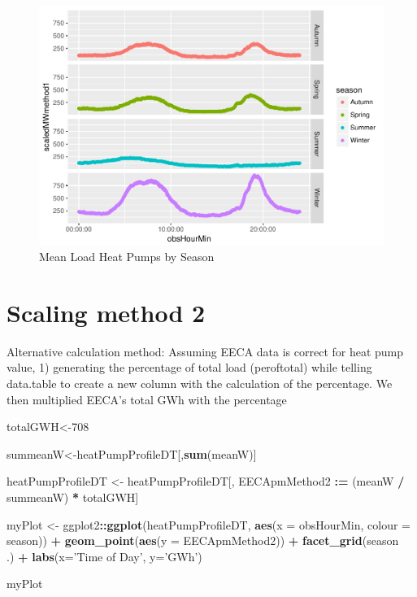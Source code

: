 \documentclass[]{article}
\newenvironment{Shaded}{\begin{snugshade}}{\end{snugshade}}
\newcommand{\KeywordTok}[1]{\textcolor[rgb]{0.13,0.29,0.53}{\textbf{#1}}}
\newcommand{\DataTypeTok}[1]{\textcolor[rgb]{0.13,0.29,0.53}{#1}}
\newcommand{\DecValTok}[1]{\textcolor[rgb]{0.00,0.00,0.81}{#1}}
\newcommand{\StringTok}[1]{\textcolor[rgb]{0.31,0.60,0.02}{#1}}
\newcommand{\OperatorTok}[1]{\textcolor[rgb]{0.81,0.36,0.00}{\textbf{#1}}}
\newcommand{\ErrorTok}[1]{\textcolor[rgb]{0.64,0.00,0.00}{\textbf{#1}}}
\newcommand{\NormalTok}[1]{#1}
\begin{document}
\begin{figure}
\centering
\includegraphics{heatPumpProfileAnalysis_files/figure-latex/scaledUpPlots-1.pdf}
\caption{\label{fig:scaledUpPlots}Mean Load Heat Pumps by Season}
\end{figure}

\section{Scaling method 2}\label{scaling-method-2}

Alternative calculation method: Assuming EECA data is correct for heat
pump value, 1) generating the percentage of total load (peroftotal)
while telling data.table to create a new column with the calculation of
the percentage. We then multiplied EECA's total GWh with the percentage

\begin{Shaded}
\begin{Highlighting}[]
\NormalTok{totalGWH<-}\DecValTok{708}

\NormalTok{summeanW<-heatPumpProfileDT[,}\KeywordTok{sum}\NormalTok{(meanW)]}



\NormalTok{heatPumpProfileDT <-}\StringTok{ }\NormalTok{heatPumpProfileDT[, EECApmMethod2 }\OperatorTok{:}\ErrorTok{=}\StringTok{ }\NormalTok{(meanW }\OperatorTok{/}\StringTok{ }\NormalTok{summeanW) }\OperatorTok{*}\StringTok{ }\NormalTok{totalGWH] }

\NormalTok{myPlot <-}\StringTok{ }\NormalTok{ggplot2}\OperatorTok{::}\KeywordTok{ggplot}\NormalTok{(heatPumpProfileDT, }\KeywordTok{aes}\NormalTok{(}\DataTypeTok{x =}\NormalTok{ obsHourMin, }\DataTypeTok{colour =}\NormalTok{ season)) }\OperatorTok{+}
\StringTok{  }\KeywordTok{geom_point}\NormalTok{(}\KeywordTok{aes}\NormalTok{(}\DataTypeTok{y =}\NormalTok{ EECApmMethod2)) }\OperatorTok{+}
\StringTok{  }\KeywordTok{facet_grid}\NormalTok{(season }\OperatorTok{~}\StringTok{ }\NormalTok{.) }\OperatorTok{+}
\StringTok{  }\KeywordTok{labs}\NormalTok{(}\DataTypeTok{x=}\StringTok{'Time of Day'}\NormalTok{, }\DataTypeTok{y=}\StringTok{'GWh'}\NormalTok{)}

\NormalTok{myPlot}
\end{Highlighting}
\end{Shaded}
\end{document}

